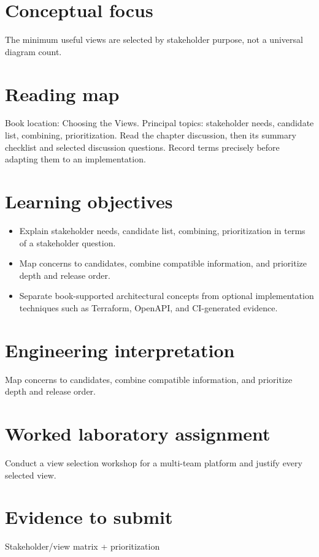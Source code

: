 \documentclass[10pt,letterpaper]{article}
\begin{document}
\DocProvenance
\section{Conceptual focus}
The minimum useful views are selected by stakeholder purpose, not a universal diagram count.

\section{Reading map}
Book location: Choosing the Views. Principal topics: stakeholder needs, candidate list, combining, prioritization. Read the chapter discussion, then its summary checklist and selected discussion questions. Record terms precisely before adapting them to an implementation.

\section{Learning objectives}
\begin{itemize}
\item Explain stakeholder needs, candidate list, combining, prioritization in terms of a stakeholder question.
\item Map concerns to candidates, combine compatible information, and prioritize depth and release order.
\item Separate book-supported architectural concepts from optional implementation techniques such as Terraform, OpenAPI, and CI-generated evidence.
\end{itemize}
\section{Engineering interpretation}
Map concerns to candidates, combine compatible information, and prioritize depth and release order.

\section{Worked laboratory assignment}
Conduct a view selection workshop for a multi-team platform and justify every selected view.

\section{Evidence to submit}
Stakeholder/view matrix + prioritization
\end{document}
